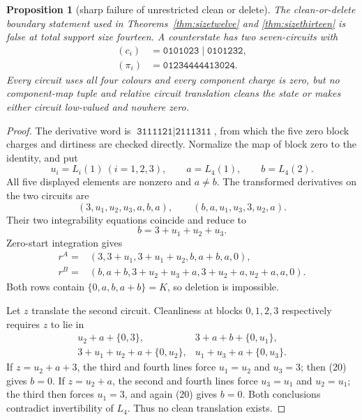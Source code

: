 \documentclass[11pt]{article}
\newtheorem{proposition}[theorem]{Proposition}
\theoremstyle{definition}
\theoremstyle{remark}
\begin{document}
\begin{proposition}[sharp failure of unrestricted clean or delete]
\label{prop:sizefourteenfailure}
The clean-or-delete boundary statement used in
Theorems~\ref{thm:sizetwelve} and \ref{thm:sizethirteen} is false at
total support size fourteen.  A counterstate has two seven-circuits with
\[
\begin{split}
(c_i)&=\texttt{0101023}\mid\texttt{0101232},\\
(\pi_i)&=\texttt{01234444413024}.
\end{split}                                               \tag{19}
\]
Every circuit uses all four colours and every component charge is zero,
but no component-map tuple and relative circuit translation cleans the
state or makes either circuit low-valued and nowhere zero.
\end{proposition}

\begin{proof}
The derivative word is
\(\texttt{3111121}\mid\texttt{2111311}\), from which the five zero block
charges and dirtiness are checked directly.  Normalize the map of block
zero to the identity, and put
\[
 u_i=L_i(1)\ (i=1,2,3),\qquad a=L_4(1),\qquad b=L_4(2).
\]
All five displayed elements are nonzero and \(a\ne b\).
The transformed derivatives on the two circuits are
\[
(3,u_1,u_2,u_3,a,b,a),\qquad
(b,a,u_1,u_3,3,u_2,a).
\]
Their two integrability equations coincide and reduce to
\[
                            b=3+u_1+u_2+u_3.             \tag{20}
\]
Zero-start integration gives
\[
\begin{split}
r^A={}&(3,3+u_1,3+u_1+u_2,b,a+b,a,0),\\
r^B={}&(b,a+b,3+u_2+u_3+a,3+u_2+a,u_2+a,a,0).
\end{split}
\]
Both rows contain \(\{0,a,b,a+b\}=K\), so deletion is impossible.

Let \(z\) translate the second circuit.  Cleanliness at blocks
\(0,1,2,3\) respectively requires \(z\) to lie in
\[
\begin{array}{ll}
u_2+a+\{0,3\},&
3+a+b+\{0,u_1\},\\
3+u_1+u_2+a+\{0,u_2\},&
u_1+u_3+a+\{0,u_3\}.                                    \tag{21}
\end{array}
\]
If \(z=u_2+a+3\), the third and fourth lines force
\(u_1=u_2\) and \(u_3=3\); then (20) gives \(b=0\).
If \(z=u_2+a\), the second and fourth lines force
\(u_3=u_1\) and \(u_2=u_1\); the third then forces \(u_1=3\), and again
(20) gives \(b=0\).  Both conclusions contradict invertibility of
\(L_4\).  Thus no clean translation exists.
\end{proof}
\end{document}
